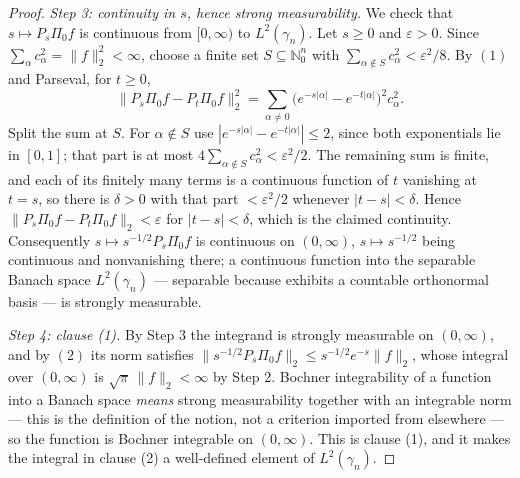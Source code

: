 \begin{proof}
\emph{Step 3: continuity in $s$, hence strong measurability.}
We check that $s \mapsto P_s\Pi_0f$ is continuous from $[0,\infty)$ to
$L^2(\gamma_n)$.  Let $s \geq 0$ and $\varepsilon > 0$.  Since
$\sum_\alpha c_\alpha^2 = \|f\|_2^2 < \infty$, choose a finite set
$S \subseteq \mathbb{N}_0^n$ with $\sum_{\alpha\notin S}c_\alpha^2 < \varepsilon^2/8$.
By $(1)$ and Parseval, for $t \geq 0$,
\[
  \|P_s\Pi_0f - P_t\Pi_0f\|_2^2
    = \sum_{\alpha\neq0}\bigl(e^{-s|\alpha|}-e^{-t|\alpha|}\bigr)^2 c_\alpha^2 .
\]
Split the sum at $S$.  For $\alpha \notin S$ use
$|e^{-s|\alpha|}-e^{-t|\alpha|}| \leq 2$, since both exponentials lie in $[0,1]$;
that part is at most $4\sum_{\alpha\notin S}c_\alpha^2 < \varepsilon^2/2$.  The
remaining sum is finite, and each of its finitely many terms is a continuous
function of $t$ vanishing at $t = s$, so there is $\delta > 0$ with that part
$< \varepsilon^2/2$ whenever $|t-s| < \delta$.  Hence
$\|P_s\Pi_0f - P_t\Pi_0f\|_2 < \varepsilon$ for $|t-s| < \delta$, which is the
claimed continuity.  Consequently $s \mapsto s^{-1/2}P_s\Pi_0f$ is continuous on
$(0,\infty)$, $s \mapsto s^{-1/2}$ being continuous and nonvanishing there; a
continuous function into the separable Banach space $L^2(\gamma_n)$ --- separable
because  exhibits a countable orthonormal basis --- is
strongly measurable.

\emph{Step 4: clause (1).}
By Step 3 the integrand is strongly measurable on $(0,\infty)$, and by $(2)$ its
norm satisfies
$\|s^{-1/2}P_s\Pi_0f\|_2 \leq s^{-1/2}e^{-s}\|f\|_2$, whose integral over
$(0,\infty)$ is $\sqrt\pi\,\|f\|_2 < \infty$ by Step 2.  Bochner integrability
of a function into a Banach space \emph{means} strong measurability together
with an integrable norm --- this is the definition of the notion, not a
criterion imported from elsewhere --- so the function is Bochner integrable on
$(0,\infty)$.  This is clause (1), and
it makes the integral in clause (2) a well-defined element of $L^2(\gamma_n)$.


\end{proof}
